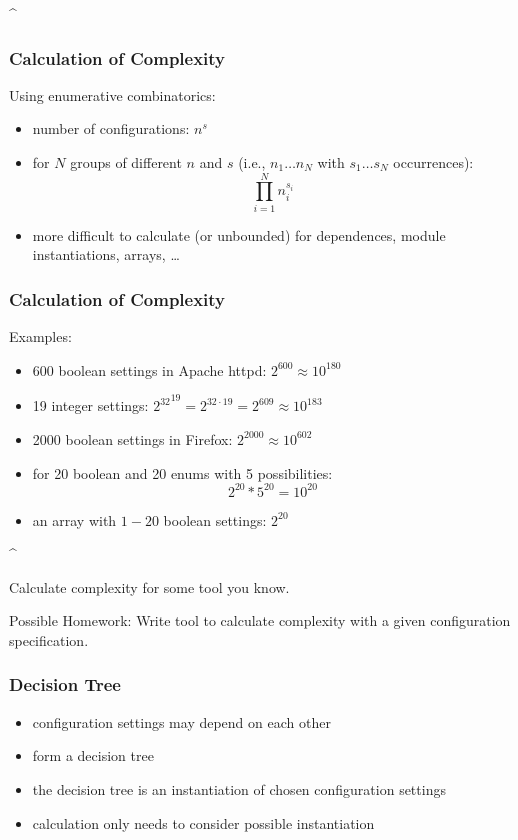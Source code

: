 \lstDeleteShortInline^
\begin{frame}
	\frametitle{Calculation of Complexity}

	Using enumerative combinatorics:
	\begin{itemize}
	\item number of configurations: $n^s$
	\item for $N$ groups of different $n$ and $s$ (i.e., $n_1 \dots n_N$ with $s_1 \dots s_N$ occurrences):  $$\prod_{i=1}^{N} n_i^{s_i}$$
	\item more difficult to calculate (or unbounded) for dependences, module instantiations, arrays, \dots
	\end{itemize}
\end{frame}

\begin{frame}
	\frametitle{Calculation of Complexity}

	Examples:
	\begin{itemize}
	\item 600 boolean settings in Apache httpd:
	\pause
	$2^{600} \approx 10^{180}$

	\item 19 integer settings:
	\pause
	${2^{32}}^{19} = 2^{32 \cdot 19} = 2^{609} \approx 10^{183}$

	\item 2000 boolean settings in Firefox:
	\pause
	$2^{2000} \approx 10^{602}$

	\item for 20 boolean and 20 enums with 5 possibilities:
	\pause
	$$2^{20}*5^{20} = 10^{20}$$

	\item an array with $1-20$ boolean settings:
	\pause
	$2^{20}$
	\end{itemize}
\end{frame}
\lstMakeShortInline[postbreak=,keywordstyle={}]^

\begin{assignment}
	\begin{task}
	Calculate complexity for some tool you know.
	\end{task}

	\begin{task}
	Possible Homework: Write tool to calculate complexity with a given configuration specification.
	\end{task}
\end{assignment}

\begin{frame}
	\frametitle{Decision Tree}
	\begin{itemize}
	\item configuration settings may depend on each other
	\item form a decision tree~\cite{reiser2009cvm,czarnecki2012cool}
	\item the decision tree is an instantiation of chosen configuration settings
	\item calculation only needs to consider possible instantiation
	\end{itemize}
\end{frame}

